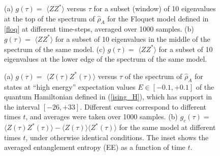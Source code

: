 \documentclass[aps,prb,preprint,onecolumn,amsmath,amssymb,superscriptaddress,eqsecnum,floatfix,scrartcl]{revtex4-1}
\begin{document}
\begin{figure}[hbt]
\centering
\caption{
(a) $g(\tau)=$  $\langle ZZ^*\rangle$ versus $\tau$ for a subset (window) of 10 eigenvalues at the top of the spectrum of ${\hat \rho}_A$ for the  Floquet model defined in \eqref{floq} at different time-steps,  averaged over 1000 samples. 
(b)  $g(\tau)=$ $\langle ZZ^*\rangle$ for a subset of 10 eigenvalues in the middle of the spectrum of the same model. 
(c) $g(\tau)=$ $\langle ZZ^*\rangle$ for
a subset of 10 eigenvalues at the lower edge of the spectrum of the same model.
} 
\label{fig:floq_ME}
\end{figure}





\begin{figure}[hbt]
\centering
\caption{
(a) $g(\tau)=$ $\langle Z(\tau)Z^*(\tau)\rangle$ versus $\tau$
of the spectrum of ${\hat \rho}_A$ 
 for states at ``high energy'' expectation values  $E\in [-0.1, +0.1]$ of the quantum Hamiltonian defined in (\ref{ising_H}), which has support in the interval $[-26, +33]$. Different curves correspond to  different times $t$, and  averages were taken over 1000 samples. 
 (b) $g_c(\tau)=$  $\langle Z(\tau)Z^*(\tau)\rangle-\langle Z(\tau)\rangle\langle Z^*(\tau)\rangle$ 
for the same model at different times $t$, under otherwise identical conditions.
 The inset
shows  the averaged 
entanglement entropy (EE) as a function of time $t$.
} 
\label{fig:ising}
\end{figure}
\end{document}
